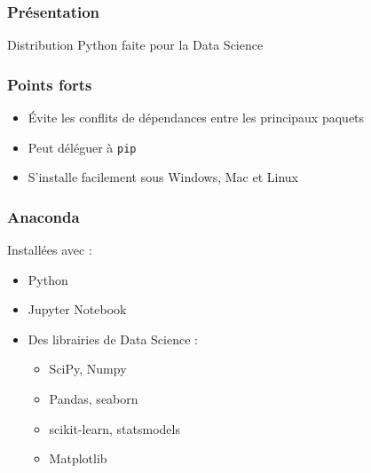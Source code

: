 \begin{frame}
  \frametitle{Présentation}
  Distribution Python faite pour la \og{}Data Science\fg{}

\end{frame}

\begin{frame}
  \frametitle{Points forts}
  \begin{itemize}
  \item Évite les conflits de dépendances entre les principaux paquets
  \item Peut déléguer à \texttt{pip}
  \item S'installe facilement sous Windows, Mac et Linux
  \end{itemize}
\end{frame}

\begin{frame}
  \frametitle{Anaconda}
  Installées avec  :
  \begin{itemize}
  \item Python
  \item Jupyter Notebook
  \item Des librairies de \og{}Data Science\fg{} :
    \begin{itemize}
    \item SciPy, Numpy
    \item Pandas, seaborn
    \item scikit-learn, statsmodels
    \item Matplotlib
    \end{itemize}
  \end{itemize}
\end{frame}

